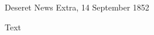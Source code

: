					Deseret News Extra, 14 September 1852
				
				\begin{description}
					\item[Text]
				\end{description}
				
					